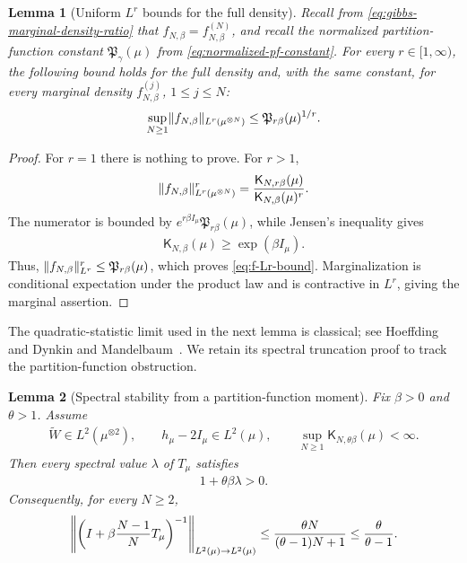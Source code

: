 \documentclass[11pt,reqno]{amsart}
\numberwithin{equation}{section}
\theoremstyle{plain}
\newtheorem{lemma}[lemma]{Lemma}
\theoremstyle{remark}
\DeclarePairedDelimiter{\pa}{\lparen}{\rparen}
\DeclarePairedDelimiter{\norm}{\lVert}{\rVert}
\newcommand{\K}{{\mathsf{K}}}
\newcommand{\tl}{\widetilde}
\newcommand{\be}{\beta}
\newcommand{\Tc}{T_\mu}
\begin{document}
\begin{lemma}[Uniform \(L^r\) bounds for the full density]\label{lem:full-density-Lr}
Recall from \eqref{eq:gibbs-marginal-density-ratio} that \(f_{N,\be}=f_{N,\be}^{(N)}\), and recall the normalized partition-function constant \(\mathfrak P_\gamma(\mu)\) from \eqref{eq:normalized-pf-constant}.  For every \(r\in[1,\infty)\), the following bound holds for the full density and, with the same constant, for every marginal density $f_{N,\be}^{(j)}$, $1\leq j\leq N$:
\begin{align}\label{eq:f-Lr-bound}
 \sup_{N\ge1}\norm{f_{N,\be}}_{L^r(\mu^{\otimes N})}\le \mathfrak P_{r\be}(\mu)^{1/r}.
\end{align}
\end{lemma}

\begin{proof}
For \(r=1\) there is nothing to prove.  For \(r>1\),
\begin{align}
 \norm{f_{N,\be}}_{L^r(\mu^{\otimes N})}^r
 =\frac{\K_{N,r\be}(\mu)}{\K_{N,\be}(\mu)^r}.
\end{align}
The numerator is bounded by \(e^{r\be I_\mu}\mathfrak P_{r\be}(\mu)\), while Jensen's inequality gives
\begin{align}\label{eq:jensen-lower-again}
\K_{N,\be}(\mu)\ge \exp\left(\be I_\mu\right).
\end{align}
Thus, \(\norm{f_{N,\be}}_{L^r}^r\le \mathfrak P_{r\be}(\mu)\), which proves \eqref{eq:f-Lr-bound}.  Marginalization is conditional expectation under the product law and is contractive in $L^r$, giving the marginal assertion.
\end{proof}

The quadratic-statistic limit used in the next lemma is classical; see Hoeffding~\cite{Hoeffding1948} and Dynkin and Mandelbaum~\cite{DynkinMandelbaum1983}.  We retain its spectral truncation proof to track the partition-function obstruction.

\begin{lemma}[Spectral stability from a partition-function moment]
\label{lem:partition-spectral-stability}
Fix \(\be>0\) and \(\theta>1\).  Assume
\begin{align}\label{eq:partition-spectral-stability-assumptions}
 \tl W\in L^2(\mu^{\otimes2}),
 \qquad
 h_\mu-2I_\mu\in L^2(\mu),
 \qquad
 \sup_{N\ge1}\K_{N,\theta\be}(\mu)<\infty.
\end{align}
Then every spectral value \(\lambda\) of \(\Tc\) satisfies
\begin{align}\label{eq:partition-spectral-strict-lower}
 1+\theta\be\lambda>0.
\end{align}
Consequently, for every \(N\ge2\),
\begin{align}\label{eq:partition-spectral-resolvent-bound}
 \norm*{\pa*{I+\be\frac{N-1}{N}\Tc}^{-1}}_{L^2(\mu)\to L^2(\mu)}
 \le \frac{\theta N}{(\theta-1)N+1}
 \le \frac{\theta}{\theta-1}.
\end{align}
\end{lemma}
\end{document}
